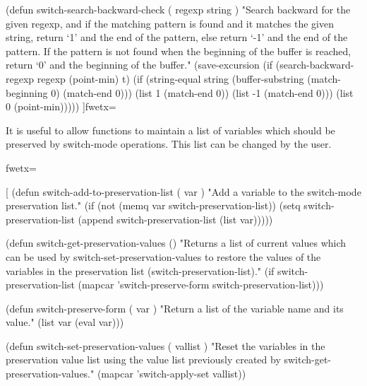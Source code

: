 {(defun switch-search-backward-check ( regexp string )
  "Search backward for the given regexp, and if the matching
pattern is found and it matches the given string, return `1'
and the end of the pattern, else return `-1' and the end of
the pattern.  If the pattern is not found when the beginning
of the buffer is reached, return `0' and the beginning of the
buffer."
  (save-excursion
    (if (search-backward-regexp regexp (point-min) t)
        (if (string-equal
             string
             (buffer-substring
              (match-beginning 0)
              (match-end 0)))
            (list 1 (match-end 0))
          (list -1 (match-end 0)))
      (list 0 (point-min)))))
]fwetx=%
\fwcdef 
\fwbeginmacronotes
{}
\fwendmacronotes
\fwendmacro


It is useful to allow functions to maintain a list of variables which
should be preserved by switch-mode operations.  This list can be
changed by the user.

\fwbeginmacro
{}\fwplusequals \fwodef {}fwetx=%
\fwcdef 
\fwbeginmacronotes
{}
\fwendmacronotes
\fwendmacro


\fwbeginmacro
{}\fwplusequals \fwodef \fwbtx[
(defun switch-add-to-preservation-list ( var )
  "Add a variable to the switch-mode preservation list."
  (if (not (memq var switch-preservation-list))
      (setq switch-preservation-list
            (append switch-preservation-list (list var)))))

(defun switch-get-preservation-values ()
  "Returns a list of current values which can be used by
switch-set-preservation-values to restore the values of
the variables in the preservation list
(switch-preservation-list)."
  (if switch-preservation-list
      (mapcar
       'switch-preserve-form
       switch-preservation-list)))

(defun switch-preserve-form ( var )
  "Return a list of the variable name and its value."
  (list var (eval var)))

(defun switch-set-preservation-values ( vallist )
  "Reset the variables in the preservation value list
using the value list previously created by
switch-get-preservation-values."
  (mapcar 'switch-apply-set vallist))

}
